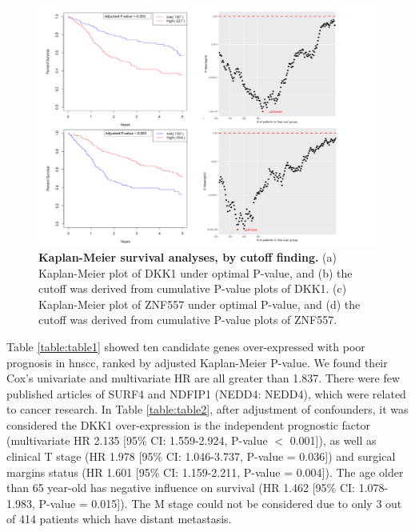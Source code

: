 \documentclass[cancers,article,submit,moreauthors,pdftex]{Definitions/mdpi}
\newcommand{\bcaption}[2]{\caption{\textbf{#1} #2}}
\begin{document}
\begin{figure}[hp]
\centering
\includegraphics[width=\textwidth]{Figure4.pdf}
\bcaption{Kaplan-Meier survival analyses, by cutoff finding.}
{(a) Kaplan-Meier plot of DKK1 under optimal P-value, and (b) the cutoff was derived from cumulative P-value plots of DKK1. (c) Kaplan-Meier plot of ZNF557 under optimal P-value, and (d) the cutoff was derived from cumulative P-value plots of ZNF557.}
\label{fig:figure4}
\end{figure}

\clearpage

Table \ref{table:table1} showed ten candidate genes over-expressed with poor prognosis in \acrshort{hnscc}, ranked by adjusted Kaplan-Meier P-value. We found their Cox's univariate and multivariate HR are all greater than 1.837. There were few published articles of \acrfull{SURF4} and \acrfull{NDFIP1} (\acrshort{NEDD4}: \acrlong{NEDD4}), which were related to cancer research.
In Table \ref{table:table2},
after adjustment of confounders, it was considered the \acrshort{DKK1} over-expression is the independent prognostic factor (multivariate HR 2.135 [95\% CI: 1.559-2.924, P-value $<$ 0.001]), as well as clinical T stage (HR 1.978 [95\% CI: 1.046-3.737, P-value = 0.036]) and surgical margins status (HR 1.601 [95\% CI: 1.159-2.211, P-value = 0.004]). The age older than 65 year-old has negative influence on survival (HR 1.462 [95\% CI: 1.078-1.983, P-value = 0.015]). The M stage could not be considered due to only 3 out of 414 patients which have distant metastasis.
\end{document}
